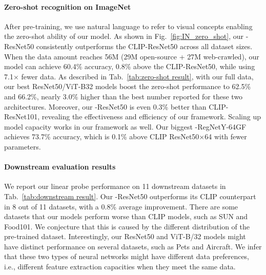 \paragraph{Zero-shot recognition on ImageNet} 
After pre-training, we use natural language to refer to visual concepts enabling the zero-shot ability of our model.
As shown in Fig.~\ref{fig:IN_zero_shot}, our \workname-ResNet50 consistently outperforms the CLIP-ResNet50 across all dataset sizes.
When the data amount reaches 56M (29M open-source + 27M web-crawled), our model can achieve 60.4\% accuracy, 0.8\% above the CLIP-ResNet50, while using 7.1$\times$ fewer data. 
As described in Tab.~\ref{tab:zero-shot result}, with our full data, our best ResNet50/ViT-B32 models boost the zero-shot performance to 62.5\% and 66.2\%, nearly 3.0\% higher than the best number reported for these two architectures. Moreover, our \workname-ResNet50 is even 0.3\% better than CLIP-ResNet101, revealing the effectiveness and efficiency of our framework. Scaling up model capacity works in our framework as well. Our biggest \workname-RegNetY-64GF achieves 73.7\% accuracy, which is 0.1\% above CLIP ResNet50$\times$64 with fewer parameters. 

\paragraph{Downstream evaluation results} We report our linear probe performance on 11 downstream datasets in Tab.~\ref{tab:downstream result}. 
Our \workname-ResNet50 outperforms its CLIP counterpart in 8 out of 11 datasets, with a 0.8\% average improvement.
There are some datasets that our models perform worse than CLIP models, such as SUN and Food101. We conjecture that this is caused by the different distribution of the pre-trained dataset. Interestingly, our ResNet50 and ViT-B/32 models might have distinct performance on several datasets, such as Pets and Aircraft. We infer that these two types of neural networks might have different data preferences, i.e., different feature extraction capacities when they meet the same data.




